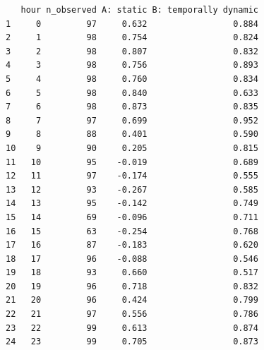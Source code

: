 \documentclass[
  letterpaper,
  DIV=11,
  numbers=noendperiod]{scrartcl}
\begin{document}
\begin{verbatim}
   hour n_observed A: static B: temporally dynamic
1     0         97     0.632                 0.884
2     1         98     0.754                 0.824
3     2         98     0.807                 0.832
4     3         98     0.756                 0.893
5     4         98     0.760                 0.834
6     5         98     0.840                 0.633
7     6         98     0.873                 0.835
8     7         97     0.699                 0.952
9     8         88     0.401                 0.590
10    9         90     0.205                 0.815
11   10         95    -0.019                 0.689
12   11         97    -0.174                 0.555
13   12         93    -0.267                 0.585
14   13         95    -0.142                 0.749
15   14         69    -0.096                 0.711
16   15         63    -0.254                 0.768
17   16         87    -0.183                 0.620
18   17         96    -0.088                 0.546
19   18         93     0.660                 0.517
20   19         96     0.718                 0.832
21   20         96     0.424                 0.799
22   21         97     0.556                 0.786
23   22         99     0.613                 0.874
24   23         99     0.705                 0.873
\end{verbatim}
\end{document}
